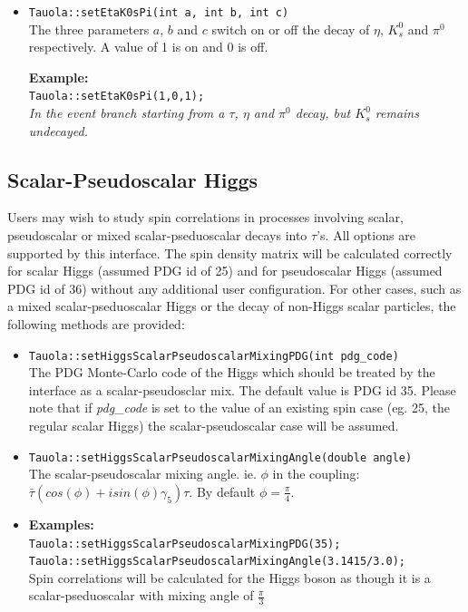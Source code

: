 \documentclass[]{Tauola_interface_design}
\begin{document}
\begin{itemize}
 \item {\tt Tauola::setEtaK0sPi(int a, int b, int c) } \hfill \\ The
   three parameters $a$, $b$ and $c$ switch on or off the decay of
   $\eta$, $K_s^0$ and $\pi^0$ respectively. A value of 1 is on and 0 is off.

\noindent
\textbf{Example:} \hfill \\
  {\tt Tauola::setEtaK0sPi(1,0,1); } \\
\emph{In the event branch starting from a $\tau$, $\eta$ and $\pi^0$ decay, 
but $K_s^0$ remains undecayed.
 } \hfill \\
\end{itemize}
 

\subsection{Scalar-Pseudoscalar Higgs}
Users may wish to study spin correlations in processes involving scalar, pseudoscalar
or mixed scalar-pseduoscalar decays into $\tau$'s. All
options are supported by this interface.
The spin density matrix will be calculated correctly for scalar Higgs
(assumed PDG id of 25) and for pseudoscalar Higgs (assumed PDG id of 36)
without any additional user configuration. For other cases, such as a mixed 
scalar-pseduoscalar Higgs or the decay of non-Higgs scalar particles, 
the following methods are provided:

\begin{itemize}
\item {\tt Tauola::setHiggsScalarPseudoscalarMixingPDG(int pdg\_code)} \hfill \\
The PDG Monte-Carlo code of the Higgs which should be treated by the interface as
a scalar-pseudosclar mix. The default value is PDG id 35. Please note that if
\emph{pdg\_code} is set to the value of an existing spin case (eg. 25, the 
regular scalar Higgs) the scalar-pseudoscalar case will be assumed.
\item {\tt Tauola::setHiggsScalarPseudoscalarMixingAngle(double angle)} \hfill \\
The scalar-pseudoscalar mixing angle. ie. $\phi$ in the coupling: 
$\bar{\tau}(cos(\phi)+isin(\phi)\gamma_5)\tau$. By default $\phi=\frac{\pi}{4}$.
\item 
 \textbf{Examples:} \hfill \\
  {\tt Tauola::setHiggsScalarPseudoscalarMixingPDG(35); } \\
  {\tt Tauola::setHiggsScalarPseudoscalarMixingAngle(3.1415/3.0); } \\
  {Spin correlations will be calculated for the Higgs boson as though it is a scalar-pseduoscalar with mixing angle of $\frac{\pi}{3}$} \hfill \\
\end{itemize}
\end{document}
